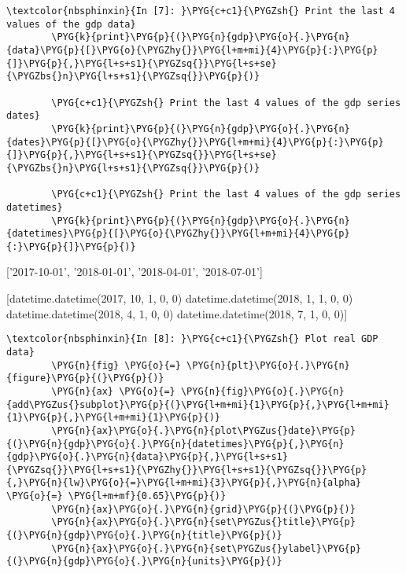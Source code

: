 \documentclass[letterpaper,10pt,openany,oneside,english]{sphinxmanual}
\begin{document}
%
\begin{Verbatim}[commandchars=\\\{\}]
\textcolor{nbsphinxin}{In [7]: }\PYG{c+c1}{\PYGZsh{} Print the last 4 values of the gdp data}
        \PYG{k}{print}\PYG{p}{(}\PYG{n}{gdp}\PYG{o}{.}\PYG{n}{data}\PYG{p}{[}\PYG{o}{\PYGZhy{}}\PYG{l+m+mi}{4}\PYG{p}{:}\PYG{p}{]}\PYG{p}{,}\PYG{l+s+s1}{\PYGZsq{}}\PYG{l+s+se}{\PYGZbs{}n}\PYG{l+s+s1}{\PYGZsq{}}\PYG{p}{)}
        
        \PYG{c+c1}{\PYGZsh{} Print the last 4 values of the gdp series dates}
        \PYG{k}{print}\PYG{p}{(}\PYG{n}{gdp}\PYG{o}{.}\PYG{n}{dates}\PYG{p}{[}\PYG{o}{\PYGZhy{}}\PYG{l+m+mi}{4}\PYG{p}{:}\PYG{p}{]}\PYG{p}{,}\PYG{l+s+s1}{\PYGZsq{}}\PYG{l+s+se}{\PYGZbs{}n}\PYG{l+s+s1}{\PYGZsq{}}\PYG{p}{)}
        
        \PYG{c+c1}{\PYGZsh{} Print the last 4 values of the gdp series datetimes}
        \PYG{k}{print}\PYG{p}{(}\PYG{n}{gdp}\PYG{o}{.}\PYG{n}{datetimes}\PYG{p}{[}\PYG{o}{\PYGZhy{}}\PYG{l+m+mi}{4}\PYG{p}{:}\PYG{p}{]}\PYG{p}{)}
\end{Verbatim}



%
\begin{OriginalVerbatim}[commandchars=\\\{\}]
[18223.758 18323.963 18511.576 18671.497]

['2017-10-01', '2018-01-01', '2018-04-01', '2018-07-01']

[datetime.datetime(2017, 10, 1, 0, 0) datetime.datetime(2018, 1, 1, 0, 0)
 datetime.datetime(2018, 4, 1, 0, 0) datetime.datetime(2018, 7, 1, 0, 0)]
\end{OriginalVerbatim}
\relax

%
\begin{Verbatim}[commandchars=\\\{\}]
\textcolor{nbsphinxin}{In [8]: }\PYG{c+c1}{\PYGZsh{} Plot real GDP data}
        \PYG{n}{fig} \PYG{o}{=} \PYG{n}{plt}\PYG{o}{.}\PYG{n}{figure}\PYG{p}{(}\PYG{p}{)}
        \PYG{n}{ax} \PYG{o}{=} \PYG{n}{fig}\PYG{o}{.}\PYG{n}{add\PYGZus{}subplot}\PYG{p}{(}\PYG{l+m+mi}{1}\PYG{p}{,}\PYG{l+m+mi}{1}\PYG{p}{,}\PYG{l+m+mi}{1}\PYG{p}{)}
        \PYG{n}{ax}\PYG{o}{.}\PYG{n}{plot\PYGZus{}date}\PYG{p}{(}\PYG{n}{gdp}\PYG{o}{.}\PYG{n}{datetimes}\PYG{p}{,}\PYG{n}{gdp}\PYG{o}{.}\PYG{n}{data}\PYG{p}{,}\PYG{l+s+s1}{\PYGZsq{}}\PYG{l+s+s1}{\PYGZhy{}}\PYG{l+s+s1}{\PYGZsq{}}\PYG{p}{,}\PYG{n}{lw}\PYG{o}{=}\PYG{l+m+mi}{3}\PYG{p}{,}\PYG{n}{alpha} \PYG{o}{=} \PYG{l+m+mf}{0.65}\PYG{p}{)}
        \PYG{n}{ax}\PYG{o}{.}\PYG{n}{grid}\PYG{p}{(}\PYG{p}{)}
        \PYG{n}{ax}\PYG{o}{.}\PYG{n}{set\PYGZus{}title}\PYG{p}{(}\PYG{n}{gdp}\PYG{o}{.}\PYG{n}{title}\PYG{p}{)}
        \PYG{n}{ax}\PYG{o}{.}\PYG{n}{set\PYGZus{}ylabel}\PYG{p}{(}\PYG{n}{gdp}\PYG{o}{.}\PYG{n}{units}\PYG{p}{)}
\end{Verbatim}
\end{document}
